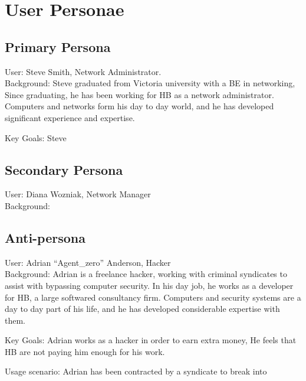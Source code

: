 \chapter{User Personae}\label{append_personae}

\section{Primary Persona}
User: Steve Smith, Network Administrator. \\

Background:  Steve graduated from Victoria university with a BE in networking, Since graduating, he has been working for HB as a network administrator. Computers and networks form his day to day world, and he has developed significant experience and expertise. 

Key Goals: Steve

\section{Secondary Persona}

User: Diana Wozniak, Network Manager \\

Background: 

\section{Anti-persona}
User: Adrian ``Agent\_zero'' Anderson, Hacker \\

Background: Adrian is a freelance hacker, working with criminal syndicates to assist with bypassing computer security. In his day job, he works as a developer for HB, a large softwared consultancy firm. Computers and security systems are a day to day part of his life, and he has developed considerable expertise with them. 

Key Goals: Adrian works as a hacker in order to earn extra money, He feels that HB are not paying him enough for his work. 

Usage scenario: Adrian has been contracted by a syndicate to break into 